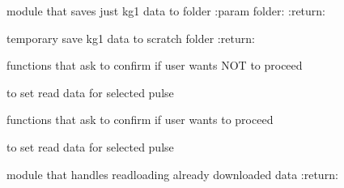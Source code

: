 \documentclass[letterpaper,10pt,english]{sphinxmanual}
\begin{document}
\begin{fulllineitems}
\begin{fulllineitems}
\end{fulllineitems}


\begin{fulllineitems}
\label{Cormat_main:Cormat_main.CORMAT_GUI.save_kg1}
module that saves just kg1 data to folder
:param folder:
:return:

\end{fulllineitems}


\begin{fulllineitems}
\label{Cormat_main:Cormat_main.CORMAT_GUI.dump_kg1}
temporary save kg1 data to scratch folder
:return:

\end{fulllineitems}


\begin{fulllineitems}
\label{Cormat_main:Cormat_main.CORMAT_GUI.handle_no}
functions that ask to confirm if user wants NOT to proceed

to set read data for selected pulse

\end{fulllineitems}


\begin{fulllineitems}
\label{Cormat_main:Cormat_main.CORMAT_GUI.handle_yes}
functions that ask to confirm if user wants to proceed

to set read data for selected pulse

\end{fulllineitems}


\begin{fulllineitems}
\label{Cormat_main:Cormat_main.CORMAT_GUI.handle_yes_reload}
module that handles readloading already downloaded data
:return:

\end{fulllineitems}


\end{fulllineitems}
\end{document}
